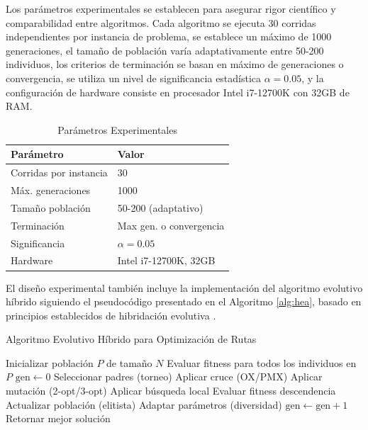\documentclass[10pt,a4paper]{article}
\begin{document}
\begin{multicols}{2}
Los parámetros experimentales se establecen para asegurar rigor científico y comparabilidad entre algoritmos. Cada algoritmo se ejecuta 30 corridas independientes por instancia de problema, se establece un máximo de 1000 generaciones, el tamaño de población varía adaptativamente entre 50-200 individuos, los criterios de terminación se basan en máximo de generaciones o convergencia, se utiliza un nivel de significancia estadística $\alpha = 0.05$, y la configuración de hardware consiste en procesador Intel i7-12700K con 32GB de RAM.

\begin{table}[H]
\centering
\small
\renewcommand{\arraystretch}{0.9} %
\caption{Parámetros Experimentales}
\begin{tabular}{@{}ll@{}}
\toprule
\textbf{Parámetro} & \textbf{Valor} \\
\midrule
Corridas por instancia & 30 \\
Máx. generaciones & 1000 \\
Tamaño población & 50-200 (adaptativo) \\
Terminación & Max gen. o convergencia \\
Significancia & $\alpha = 0.05$ \\
Hardware & Intel i7-12700K, 32GB \\
\bottomrule
\end{tabular}
\label{tab:parameters}
\end{table}

El diseño experimental también incluye la implementación del algoritmo evolutivo híbrido siguiendo el pseudocódigo presentado en el Algoritmo \ref{alg:hea}, basado en principios establecidos de hibridación evolutiva \cite{alba2013}.


\begin{algorithm}[H]
\small %
\caption{Algoritmo Evolutivo Híbrido para Optimización de Rutas}
\label{alg:hea}
\begin{algorithmic}[1]
\STATE Inicializar población $P$ de tamaño $N$
\STATE Evaluar fitness para todos los individuos en $P$
\STATE $\text{gen} \leftarrow 0$
    \STATE Seleccionar padres (torneo)
    \STATE Aplicar cruce (OX/PMX)
    \STATE Aplicar mutación (2-opt/3-opt)
    \STATE Aplicar búsqueda local
    \STATE Evaluar fitness descendencia
    \STATE Actualizar población (elitista)
    \STATE Adaptar parámetros (diversidad)
    \STATE $\text{gen} \leftarrow \text{gen} + 1$
\ENDWHILE
\STATE Retornar mejor solución
\end{algorithmic}
\end{algorithm}



\end{multicols}
\end{document}
